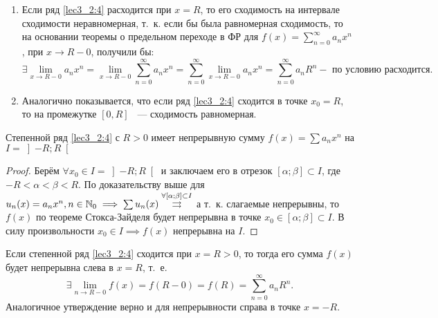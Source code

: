\documentclass[../../main.tex]{subfiles}
\begin{document}
\begin{rems}
	\;
	
	\begin{enumerate}
		\item Если ряд \eqref{lec3_2:4} расходится при $x = R$, то его 
		сходимость на интервале сходимости неравномерная, т.~к. если 
		бы была равномерная сходимость, то на основании теоремы 
		о предельном переходе в ФР для $f(x) = \sum\limits_{n = 0}^{\infty} 
		a_n x^n$, при $x \longrightarrow R - 0$, получили бы:
		\[ \exists \underset{x \to R - 0}{\lim} a_n x^n = 
		\underset{x \to R - 0}{\lim} \sum\limits_{n = 0}^{\infty} a_n x^n = 	
		\sum\limits_{n = 0}^{\infty} \underset{x \to R - 0}{\lim} a_n x^n = 
		\sum\limits_{n = 0}^{\infty} a_n R^n - \text{ по условию расходится.}
		\]
		
		\item Аналогично показывается, что если ряд 
		\eqref{lec3_2:4} сходится в точке 
		$x_0 = R$, то на промежутке $[0, R]$ ~--- сходимость равномерная.
	\end{enumerate}
\end{rems}

\begin{crl}
	\;
	
	Степенной ряд \eqref{lec3_2:4} с $R > 0$ имеет непрерывную сумму 
	$f(x) = \sum a_n x^n$ на $I = \left]-R; R\right[$
\end{crl}

\begin{proof}
	Берём $\forall x_0 \in I = \left]-R; R\right[$ и заключаем его в отрезок 
	$[\alpha; \beta] \subset I$, где $-R < \alpha < \beta < R$. 
	По доказательству выше для $u_n(x) = a_n x^n, n \in \mathbb{N}_0 \implies 
	\sum u_n(x) \overset{\forall [\alpha; \beta] \subset I}{\rightrightarrows}$
	а т.~к. слагаемые непрерывны, то $f(x)$ по теореме Стокса-Зайделя
	будет непрерывна в точке $x_0 \in [\alpha; \beta] \subset I$.
	В силу произвольности $x_0 \in I \implies f(x)$ непрерывна на $I$.
\end{proof}

\begin{crl}
	Если степенной ряд \eqref{lec3_2:4} сходится при $x = R > 0$, то
	тогда его сумма $f(x)$ будет непрерывна слева в $x = R$, т.~е.
	\[ \exists \underset{n \to R - 0}{\lim} f(x) = f(R - 0) = f(R) 
	= \sum\limits_{n = 0}^{\infty} a_n R^n.
	\]
	Аналогичное утверждение верно и для непрерывности справа в точке $x = -R$.
\end{crl}
\end{document}
